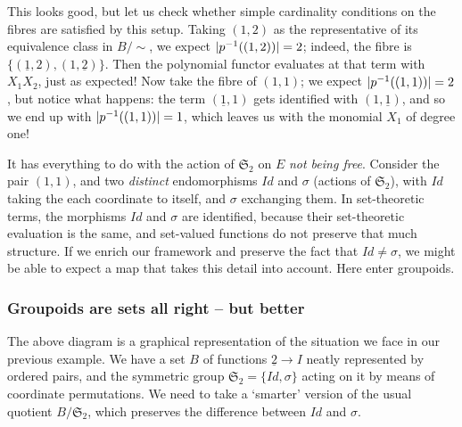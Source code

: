 This looks good, but let us check whether simple cardinality conditions on the fibres are satisfied by this setup. Taking $(1,2)$ as the representative of its equivalence class in $B/\sim$, we expect $|p^{-1}((1,2))|=2$; indeed, the fibre is $\{(\underline{1},2),(1,\underline{2})\}$. Then the polynomial functor evaluates at that term with $X_1X_2$, just as expected! Now take the fibre of $(1,1)$; we expect $|p^{-1}((1,1))|=2$, but notice what happens: the term $(\underline{1},1)$ gets identified with $(1,\underline{1})$, and so we end up with $|p^{-1}((1,1))|=1$, which leaves us with the monomial $X_1$ of degree one!

It has everything to do with the action of $\mathfrak{S}_2$ on $E$ \emph{not being free}. Consider the pair $(1,1)$, and two \emph{distinct} endomorphisms $Id$ and $\sigma$ (actions of $\mathfrak{S}_2$), with $Id$ taking the each coordinate to itself, and $\sigma$ exchanging them. In set-theoretic terms, the morphisms $Id$ and $\sigma$ are identified, because their set-theoretic evaluation is the same, and set-valued functions do not preserve that much structure. If we enrich our framework and preserve the fact that $Id\neq\sigma$, we might be able to expect a map that takes this detail into account. Here enter groupoids.

\subsubsection{Groupoids are sets all right -- but better}

\begin{figure}[!ht]
\centering
{}
\end{figure}

The above diagram is a graphical representation of the situation we face in our previous example. We have a set $B$ of functions $\underline{2}\to I$ neatly represented by ordered pairs, and the symmetric group $\mathfrak{S}_2=\{Id,\sigma\}$ acting on it by means of coordinate permutations. We need to take a `smarter' version of the usual quotient $B/\mathfrak{S}_2$, which preserves the difference between $Id$ and $\sigma$.

